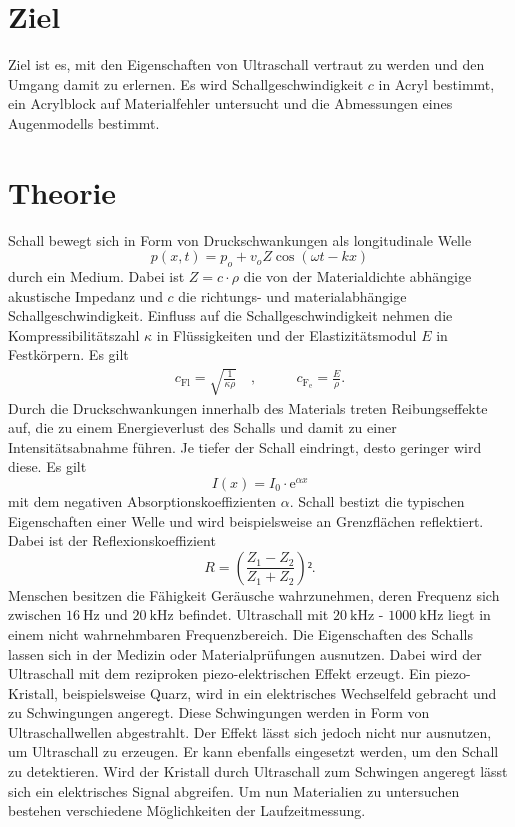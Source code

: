 \section*{Ziel}
Ziel ist es, mit den Eigenschaften von Ultraschall vertraut zu werden und den Umgang damit zu erlernen. Es wird Schallgeschwindigkeit $c$ in Acryl bestimmt, ein Acrylblock auf Materialfehler untersucht und die Abmessungen eines Augenmodells bestimmt.

\section{Theorie}
\label{sec:Theorie}
Schall bewegt sich in Form von Druckschwankungen als longitudinale Welle
\begin{equation}
p(x,t)=p_o+v_oZ\cos{(\omega t - kx)}
\label{eq:long_welle}
\end{equation}
durch ein Medium. Dabei ist $Z=c\cdot\rho$ die von der Materialdichte abhängige akustische Impedanz und $c$ die richtungs- und materialabhängige Schallgeschwindigkeit. Einfluss auf die Schallgeschwindigkeit nehmen die Kompressibilitätszahl $\kappa$ in Flüssigkeiten und der Elastizitätsmodul $E$ in Festkörpern. Es gilt
\begin{align}
c_\mathup{Fl}=\sqrt{\frac{1}{\kappa\rho}}\quad, &\qquad c_\mathup{F_e}=\frac{E}{\rho}.
\label{eq:schallgeschwindigkeit}
\end{align}
Durch die Druckschwankungen innerhalb des Materials treten Reibungseffekte auf, die zu einem Energieverlust des Schalls und damit zu einer Intensitätsabnahme führen. Je tiefer der Schall eindringt, desto geringer wird diese. Es gilt
\begin{equation}
I(x)=I_0\cdot\mathup{e}^{\alpha x}
\label{eq:intensitaet}
\end{equation}
mit dem negativen Absorptionskoeffizienten $\alpha$.
Schall bestizt die typischen Eigenschaften einer Welle und wird beispielsweise an Grenzflächen reflektiert. Dabei ist der Reflexionskoeffizient
\begin{equation}
R=\left(\frac{Z_1-Z_2}{Z_1+Z_2}\right)².
\label{eq:reflexion}
\end{equation}
Menschen besitzen die Fähigkeit Geräusche wahrzunehmen, deren Frequenz sich zwischen $\SI{16}{\hertz}$ und $\SI{20}{\kilo\hertz}$ befindet. Ultraschall mit  $\SI{20}{\kilo\hertz}$ - $\SI{1000}{\kilo\hertz}$ liegt in einem nicht wahrnehmbaren Frequenzbereich. Die Eigenschaften des Schalls lassen sich in der Medizin oder Materialprüfungen ausnutzen. Dabei wird der Ultraschall mit dem reziproken piezo-elektrischen Effekt erzeugt. Ein piezo-Kristall, beispielsweise Quarz, wird in ein elektrisches Wechselfeld gebracht und zu Schwingungen angeregt. Diese Schwingungen werden in Form von Ultraschallwellen abgestrahlt. Der Effekt lässt sich jedoch nicht nur ausnutzen, um Ultraschall zu erzeugen. Er kann ebenfalls eingesetzt werden, um den Schall zu detektieren. Wird der Kristall durch Ultraschall zum Schwingen angeregt lässt sich ein elektrisches Signal abgreifen. Um nun Materialien zu untersuchen bestehen verschiedene Möglichkeiten der Laufzeitmessung. 
